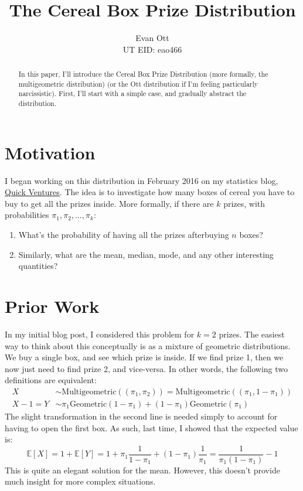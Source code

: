 \documentclass{article}
\title{\vspace{-6ex}The Cereal Box Prize Distribution\vspace{-2ex}}
\author{Evan Ott \\ UT EID: eao466\vspace{-2ex}}
\begin{document}
\maketitle
\begin{abstract}
In this paper, I'll introduce the Cereal Box Prize Distribution (more formally, the multigeometric distribution) (or the
Ott distribution if I'm feeling particularly narcissistic). First, I'll start with a simple case, and gradually abstract the 
distribution. 
\end{abstract}

\section{Motivation}
I began working on this distribution in February 2016 on my statistics blog, 
\href{https://quickventures.blogspot.com/2016/02/the-cereal-box-prize-distribution.html}{Quick Ventures}.
The idea is to investigate how many boxes of cereal you have to buy to get all the prizes inside. More formally, if 
there are $k$ prizes, with probabilities $\pi_1, \pi_2, \ldots, \pi_k$:

\begin{enumerate}[1.]
	\item What's the probability of having all the prizes afterbuying $n$ boxes?
	\item Similarly, what are the mean, median, mode, and any other interesting quantities?
\end{enumerate}

\section{Prior Work}
In my initial blog post, I considered this problem for $k=2$ prizes. The easiest way to think about this conceptually
is as a mixture of geometric distributions. We buy a single box, and see which prize is inside. If we find prize 1, then 
we now just need to find prize 2, and vice-versa. In other words, the following two definitions are equivalent:
\begin{align}
X &\sim \textrm{Multigeometric}((\pi_1, \pi_2))=\textrm{Multigeometric}((\pi_1, 1-\pi_1))\\
X-1 = Y &\sim \pi_1\textrm{Geometric}(1-\pi_1) + (1-\pi_1) \textrm{Geometric}(\pi_1)
\end{align}
The slight transformation in the second line is needed simply to account for having to open the first box. As such,
last time, I showed that the expected value is:
\begin{equation}
\mathbb{E}[X]=1+\mathbb{E}[Y]=1+\pi_1 \frac{1}{1-\pi_1} + (1-\pi_1)\frac{1}{\pi_1}=\frac{1}{\pi_1(1-\pi_1)}-1
\end{equation}
This is quite an elegant solution for the mean. However, this doesn't provide much insight for more complex 
situations.
\end{document}
